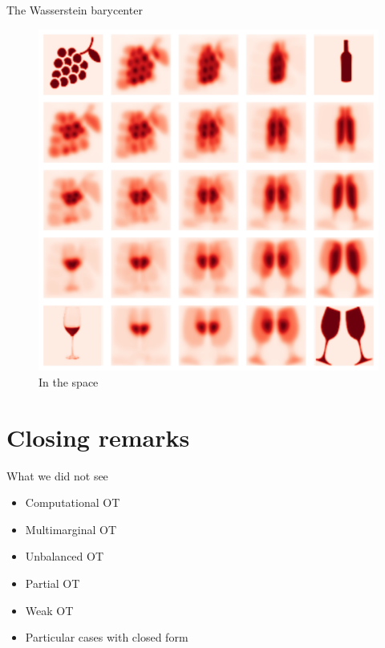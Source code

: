 \documentclass[pdf,aspectratio=169,10pt]{beamer}
\begin{document}
\begin{frame}{The Wasserstein barycenter}
\begin{minipage}{0.48\textwidth}
    \end{minipage}
    \hfill
    \begin{minipage}{0.48\textwidth}
\begin{figure}
            \centering
                \includegraphics[clip, height=0.7\textheight]{../img/symboles_wine_bary.pdf}
            \caption{In the  space}
            \end{figure}
            
        \end{minipage}
\end{frame}



\section{Closing remarks}

\begin{frame}{What we did not see}
\begin{itemize}
    \item Computational OT
    \item Multimarginal OT
    \item Unbalanced OT
    \item Partial OT
    \item Weak OT
    \item Particular cases with closed form
\end{itemize}
\end{frame}
\end{document}
